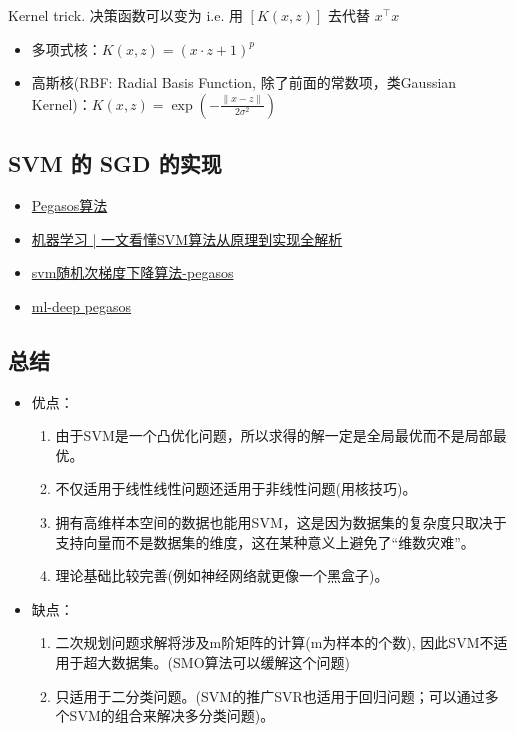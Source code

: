 \documentclass[12pt]{article}
\numberwithin{theorem}{section} %
\numberwithin{definition}{section} %
\numberwithin{assumption}{section} %
\numberwithin{lemma}{section} %
\numberwithin{remark}{section} %
\numberwithin{prop}{section} %
\numberwithin{corollary}{section} %
\numberwithin{example}{section} %
\numberwithin{question}{section} %
\numberwithin{problem}{section} %
\numberwithin{conjecture}{section} %
\numberwithin{append}{section} %
\numberwithin{property}{section} %
\begin{document}
\begin{CJK}{UTF8}{gbsn}
Kernel trick. 决策函数可以变为
i.e. 用 $[K(x,z)]$ 去代替 $x^\intercal x$
\begin{itemize}
	\item 多项式核：$K(x,z) = (x\cdot z + 1)^p$
	\item 高斯核(RBF: Radial Basis Function, 除了前面的常数项，类Gaussian Kernel)：$K(x,z) = \exp(-\frac{\lVert x-z \rVert}{2\sigma^2})$
\end{itemize}

\subsection{SVM 的 SGD 的实现}
\begin{itemize}
	\item \href{http://liuhongjiang.github.io/tech/blog/2013/01/31/svm-pegasos/}{Pegasos算法} \item\href{https://blog.csdn.net/qq_53123067/article/details/136060974}{机器学习 | 一文看懂SVM算法从原理到实现全解析}
	\item \href{https://blog.csdn.net/sinat_27612639/article/details/70037499}{svm随机次梯度下降算法-pegasos}
	\item \href{https://www.deep-ml.com/problem/Pegasos%20Kernel%20SVM%20Implementation}{ml-deep pegasos}
\end{itemize}

\subsection{总结}
\begin{itemize}
	\item 优点：
	\begin{enumerate}
		\item 由于SVM是一个凸优化问题，所以求得的解一定是全局最优而不是局部最优。
		\item 不仅适用于线性线性问题还适用于非线性问题(用核技巧)。
		\item 拥有高维样本空间的数据也能用SVM，这是因为数据集的复杂度只取决于支持向量而不是数据集的维度，这在某种意义上避免了“维数灾难”。
		\item 理论基础比较完善(例如神经网络就更像一个黑盒子)。
	\end{enumerate}
	\item 缺点：
	\begin{enumerate}
		\item 二次规划问题求解将涉及m阶矩阵的计算(m为样本的个数), 因此SVM不适用于超大数据集。(SMO算法可以缓解这个问题)
		\item 只适用于二分类问题。(SVM的推广SVR也适用于回归问题；可以通过多个SVM的组合来解决多分类问题)。
	\end{enumerate}
\end{itemize}



\end{CJK}
\end{document}
